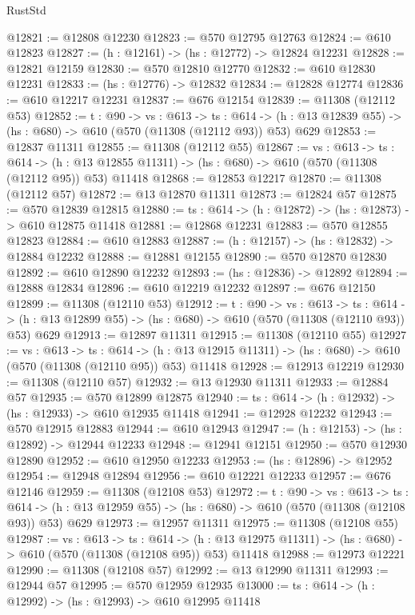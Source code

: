 \begin{lexlean}{RustStd}
\begin{coremodule}
@12821 := @12808 @12230
@12823 := @570 @12795 @12763
@12824 := @610 @12823
@12827 := (h : @12161) -> (hs : @12772) -> @12824 @12231
@12828 := @12821 @12159
@12830 := @570 @12810 @12770
@12832 := @610 @12830 @12231
@12833 := (hs : @12776) -> @12832
@12834 := @12828 @12774
@12836 := @610 @12217 @12231
@12837 := @676 @12154
@12839 := @11308 (@12112 @53)
@12852 := {t : @90} ->
  {vs : @613} ->
  {ts : @614} -> (h : @13 @12839 @55) -> (hs : @680) -> @610 (@570 (@11308 (@12112 @93)) @53) @629
@12853 := @12837 @11311
@12855 := @11308 (@12112 @55)
@12867 := {vs : @613} ->
  {ts : @614} ->
  (h : @13 @12855 @11311) -> (hs : @680) -> @610 (@570 (@11308 (@12112 @95)) @53) @11418
@12868 := @12853 @12217
@12870 := @11308 (@12112 @57)
@12872 := @13 @12870 @11311
@12873 := @12824 @57
@12875 := @570 @12839 @12815
@12880 := {ts : @614} -> (h : @12872) -> (hs : @12873) -> @610 @12875 @11418
@12881 := @12868 @12231
@12883 := @570 @12855 @12823
@12884 := @610 @12883
@12887 := (h : @12157) -> (hs : @12832) -> @12884 @12232
@12888 := @12881 @12155
@12890 := @570 @12870 @12830
@12892 := @610 @12890 @12232
@12893 := (hs : @12836) -> @12892
@12894 := @12888 @12834
@12896 := @610 @12219 @12232
@12897 := @676 @12150
@12899 := @11308 (@12110 @53)
@12912 := {t : @90} ->
  {vs : @613} ->
  {ts : @614} -> (h : @13 @12899 @55) -> (hs : @680) -> @610 (@570 (@11308 (@12110 @93)) @53) @629
@12913 := @12897 @11311
@12915 := @11308 (@12110 @55)
@12927 := {vs : @613} ->
  {ts : @614} ->
  (h : @13 @12915 @11311) -> (hs : @680) -> @610 (@570 (@11308 (@12110 @95)) @53) @11418
@12928 := @12913 @12219
@12930 := @11308 (@12110 @57)
@12932 := @13 @12930 @11311
@12933 := @12884 @57
@12935 := @570 @12899 @12875
@12940 := {ts : @614} -> (h : @12932) -> (hs : @12933) -> @610 @12935 @11418
@12941 := @12928 @12232
@12943 := @570 @12915 @12883
@12944 := @610 @12943
@12947 := (h : @12153) -> (hs : @12892) -> @12944 @12233
@12948 := @12941 @12151
@12950 := @570 @12930 @12890
@12952 := @610 @12950 @12233
@12953 := (hs : @12896) -> @12952
@12954 := @12948 @12894
@12956 := @610 @12221 @12233
@12957 := @676 @12146
@12959 := @11308 (@12108 @53)
@12972 := {t : @90} ->
  {vs : @613} ->
  {ts : @614} -> (h : @13 @12959 @55) -> (hs : @680) -> @610 (@570 (@11308 (@12108 @93)) @53) @629
@12973 := @12957 @11311
@12975 := @11308 (@12108 @55)
@12987 := {vs : @613} ->
  {ts : @614} ->
  (h : @13 @12975 @11311) -> (hs : @680) -> @610 (@570 (@11308 (@12108 @95)) @53) @11418
@12988 := @12973 @12221
@12990 := @11308 (@12108 @57)
@12992 := @13 @12990 @11311
@12993 := @12944 @57
@12995 := @570 @12959 @12935
@13000 := {ts : @614} -> (h : @12992) -> (hs : @12993) -> @610 @12995 @11418

\end{coremodule}
\end{lexlean}
